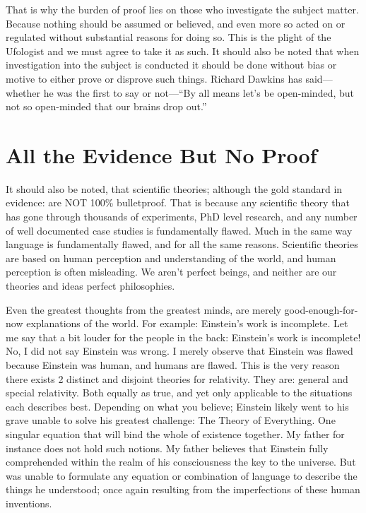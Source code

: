 That is why the burden of proof lies on those who investigate the subject matter.
Because nothing should be assumed or believed, and even more so acted on or
regulated without substantial reasons for doing so. This is the plight of the
Ufologist and we must agree to take it as such. It should also be noted that when
investigation into the subject is conducted it should be done without bias or
motive to either prove or disprove such things. Richard Dawkins has
said---whether he was the first to say or not---``By all means let's be
open-minded, but not so open-minded that our brains drop out.''

\section{All the Evidence But No Proof}\label{sec:allevidencebutnoproof}

It should also be noted, that scientific theories; although the gold standard in
evidence: are NOT 100\% bulletproof. That is because any scientific theory that
has gone through thousands of experiments, PhD level research, and any number of
well documented case studies is fundamentally flawed. Much in the same way
language is fundamentally flawed, and for all the same reasons. Scientific
theories are based on human perception and understanding of the world, and human
perception is often misleading. We aren't perfect beings, and neither are our
theories and ideas perfect philosophies.

Even the greatest thoughts from the greatest minds, are merely
good-enough-for-now explanations of the world. For example: Einstein's work is
incomplete. Let me say that a bit louder for the people in the back: Einstein's
work is incomplete! No, I did not say Einstein was wrong. I merely observe that
Einstein was flawed because Einstein was human, and humans are flawed. This is
the very reason there exists 2 distinct and disjoint theories for relativity.
They are: general and special relativity. Both equally as true, and yet only
applicable to the situations each describes best. Depending on what you believe;
Einstein likely went to his grave unable to solve his greatest challenge: The
Theory of Everything. One singular equation that will bind the whole of existence
together. My father for instance does not hold such notions. My father believes
that Einstein fully comprehended within the realm of his consciousness the key to
the universe. But was unable to formulate any equation or combination of language
to describe the things he understood; once again resulting from the imperfections
of these human inventions.

